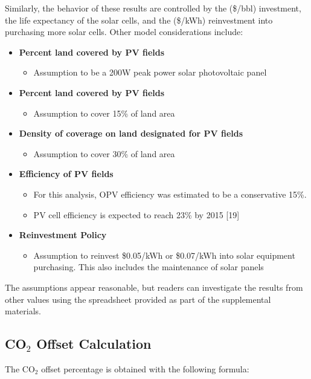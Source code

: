 \documentclass[12pt]{article}
\begin{document}
Similarly, the behavior of these results are controlled by the (\$/bbl) investment, the life expectancy of the solar cells, and the (\$/kWh) reinvestment into purchasing more solar cells. Other model considerations include:

\begin{itemize}
\item {\bf Percent land covered by PV fields}
\begin{itemize}
\item Assumption to be a 200W peak power solar photovoltaic panel
\end{itemize}
\item {\bf Percent land covered by PV fields}
\begin{itemize}
\item Assumption to cover 15\% of land area
\end{itemize}
\item {\bf Density of coverage on land designated for PV fields}
\begin{itemize}
\item	Assumption to cover 30\% of land area
\end{itemize}
\item {\bf Efficiency of PV fields}
\begin{itemize}
\item For this analysis, OPV efficiency was estimated to be a conservative 15\%.
\item PV cell efficiency is expected to reach 23\% by 2015 [19]
\end{itemize}
\item {\bf Reinvestment Policy}
\begin{itemize}
\item Assumption to reinvest \$0.05/kWh or \$0.07/kWh into solar equipment purchasing. This  also includes the maintenance of solar panels
\end{itemize}
\end{itemize}

The assumptions appear reasonable, but readers can investigate the results from other values using the spreadsheet provided as part of the supplemental materials. 

\subsection{CO$_2$ Offset Calculation}

The CO$_2$ offset percentage is obtained with the following formula:
\end{document}
